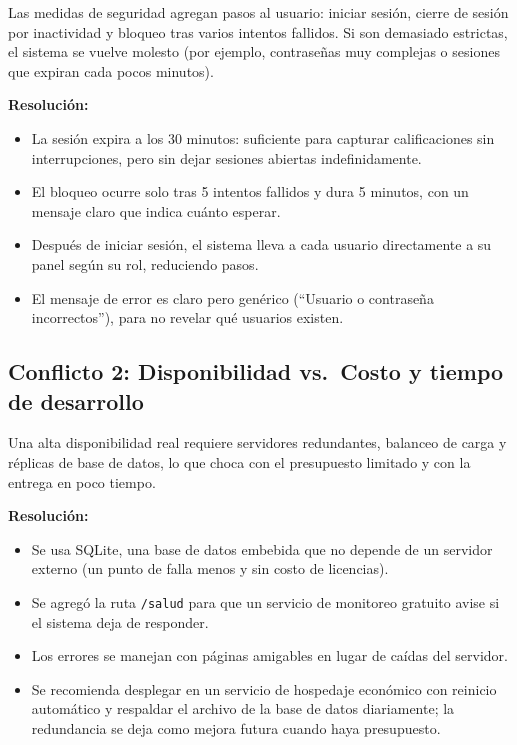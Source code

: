 \documentclass[11pt,letterpaper]{article}
\begin{document}
Las medidas de seguridad agregan pasos al usuario: iniciar sesión, cierre de sesión
por inactividad y bloqueo tras varios intentos fallidos. Si son demasiado estrictas,
el sistema se vuelve molesto (por ejemplo, contraseñas muy complejas o sesiones que
expiran cada pocos minutos).

\textbf{Resolución:}
\begin{itemize}[leftmargin=*]
  \item La sesión expira a los 30 minutos: suficiente para capturar calificaciones
        sin interrupciones, pero sin dejar sesiones abiertas indefinidamente.
  \item El bloqueo ocurre solo tras 5 intentos fallidos y dura 5 minutos, con un
        mensaje claro que indica cuánto esperar.
  \item Después de iniciar sesión, el sistema lleva a cada usuario directamente a su
        panel según su rol, reduciendo pasos.
  \item El mensaje de error es claro pero genérico (``Usuario o contraseña
        incorrectos''), para no revelar qué usuarios existen.
\end{itemize}

\subsection{Conflicto 2: Disponibilidad vs.\ Costo y tiempo de desarrollo}

Una alta disponibilidad real requiere servidores redundantes, balanceo de carga y
réplicas de base de datos, lo que choca con el presupuesto limitado y con la entrega
en poco tiempo.

\textbf{Resolución:}
\begin{itemize}[leftmargin=*]
  \item Se usa SQLite, una base de datos embebida que no depende de un servidor
        externo (un punto de falla menos y sin costo de licencias).
  \item Se agregó la ruta \texttt{/salud} para que un servicio de monitoreo gratuito
        avise si el sistema deja de responder.
  \item Los errores se manejan con páginas amigables en lugar de caídas del servidor.
  \item Se recomienda desplegar en un servicio de hospedaje económico con reinicio
        automático y respaldar el archivo de la base de datos diariamente; la
        redundancia se deja como mejora futura cuando haya presupuesto.
\end{itemize}
\end{document}
